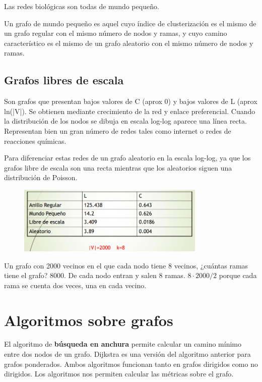 Las redes biológicas son todas de mundo pequeño. 

Un grafo de mundo pequeño es aquel cuyo índice de clusterización es el mismo de un grafo regular con el mismo número de nodos y ramas, y cuyo camino característico es el mismo de un grafo aleatorio con el mismo número de nodos y ramas. 

\subsection{Grafos libres de escala}
Son grafos que presentan bajos valores de C (aprox 0) y bajos valores de L (aprox ln(|V|). Se obtienen mediante crecimiento de la red y enlace preferencial. Cuando la distribución de los nodos se dibuja en escala log-log aparece una línea recta. Representan bien un gran número de redes tales como internet o redes de reacciones químicas.

Para diferenciar estas redes de un grafo aleatorio en la escala log-log, ya que los grafos libre de escala son una recta mientras que los aleatorios siguen una distribución de Poisson.

\begin{figure}[h]
\centering
\includegraphics[width = 0.8\textwidth]{figs/metricas-estandar.png}
\end{figure}

Un grafo con 2000 vecinos en el que cada nodo tiene 8 vecinos, ¿cuántas ramas tiene el grafo? 8000. De cada nodo entran y salen 8 ramas. $8 \cdot 2000/2$ porque cada rama se cuenta dos veces, una en cada vecino.

\section{Algoritmos sobre grafos}
El algoritmo de \textbf{búsqueda en anchura} permite calcular un camino mínimo entre dos nodos de un grafo. Dijkstra es una versión del algoritmo anterior para grafos ponderados. Ambos algoritmos funcionan tanto en grafos dirigidos como no dirigidos. Los algoritmos nos permiten calcular las métricas sobre el grafo.

